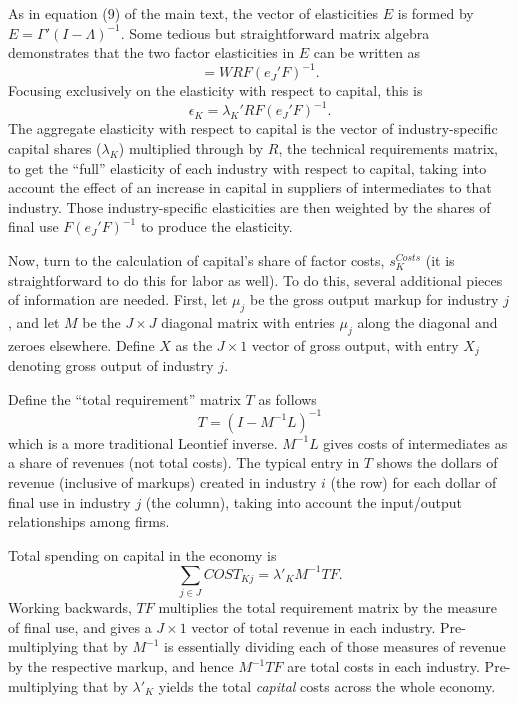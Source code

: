 \documentclass[11pt]{article}
\begin{document}
As in equation (9) of the main text, the vector of elasticities $E$ is formed by $E = \Gamma'(I-\Lambda)^{-1}$. Some tedious but straightforward matrix algebra demonstrates that the two factor elasticities in $E$ can be written as
\begin{equation}
	[\epsilon_K \text{ } \epsilon_L] = WRF(e_J'F)^{-1}. 
\end{equation}
Focusing exclusively on the elasticity with respect to capital, this is
\begin{equation}
	\epsilon_K = \lambda_K'RF(e_J'F)^{-1}.
\end{equation}
The aggregate elasticity with respect to capital is the vector of industry-specific capital shares ($\lambda_K$) multiplied through by $R$, the technical requirements matrix, to get the ``full'' elasticity of each industry with respect to capital, taking into account the effect of an increase in capital in suppliers of intermediates to that industry. Those industry-specific elasticities are then weighted by the shares of final use $F(e_J'F)^{-1}$ to produce the elasticity.

Now, turn to the calculation of capital's share of factor costs, $s_K^{Costs}$ (it is straightforward to do this for labor as well). To do this, several additional pieces of information are needed. First, let $\mu_j$ be the gross output markup for industry $j$, and let $M$ be the $J \times J$ diagonal matrix with entries $\mu_j$ along the diagonal and zeroes elsewhere. Define $X$ as the $J \times 1$ vector of gross output, with entry $X_j$ denoting gross output of industry $j$. 

Define the ``total requirement'' matrix $T$ as follows
\begin{equation}
	T = (I - M^{-1}L)^{-1}
\end{equation}
which is a more traditional Leontief inverse. $M^{-1}L$ gives costs of intermediates as a share of revenues (not total costs). The typical entry in $T$ shows the dollars of revenue (inclusive of markups) created in industry $i$ (the row) for each dollar of final use in industry $j$ (the column), taking into account the input/output relationships among firms.

Total spending on capital in the economy is
\begin{equation}
	\sum_{j \in J} COST_{Kj} = \lambda'_K M^{-1} T F. 
\end{equation}
Working backwards, $T F$ multiplies the total requirement matrix by the measure of final use, and gives a $J \times 1$ vector of total revenue in each industry. Pre-multiplying that by $M^{-1}$ is essentially dividing each of those measures of revenue by the respective markup, and hence $M^{-1} T F$ are total costs in each industry. Pre-multiplying that by $\lambda'_K$ yields the total \textit{capital} costs across the whole economy. 
\end{document}
